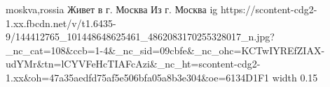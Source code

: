  
 
 
 
 

\par
moskva,rossia
Живет в г. Москва
Из г. Москва
\ifcmt
  ig https://scontent-cdg2-1.xx.fbcdn.net/v/t1.6435-9/144412765_101448648625461_4862083170255328017_n.jpg?_nc_cat=108&ccb=1-4&_nc_sid=09cbfe&_nc_ohc=KCTwIYREfZIAX-udYMr&tn=lCYVFeHcTIAFcAzi&_nc_ht=scontent-cdg2-1.xx&oh=47a35aedfd75af5e506bfa05a8b3e304&oe=6134D1F1
  width 0.15
\fi


